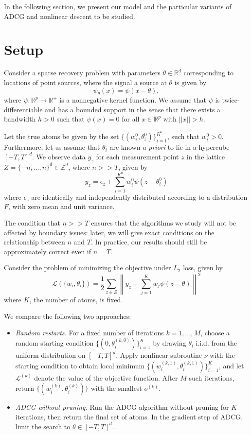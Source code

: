 \documentclass[11pt]{article}
\begin{document}
In the following section, we present our model and the particular
variants of ADCG and nonlinear descent to be studied.

\section{Setup}\label{section:Setup}

Consider a sparse recovery problem with parameters $\theta \in
\mathbb{R}^d$ corresponding to locations of point sources, where the
signal a source at $\theta$ is given by
\[
\psi_\theta(x) = \psi(x - \theta),
\]
where $\psi: \mathbb{R}^p \to \mathbb{R}^+$ is a nonnegative kernel
function.  We assume that $\psi$ is twice-differentiable and has a
bounded support in the sense that there exists a bandwidth $h > 0$
such that $\psi(x) = 0$ for all $x \in \mathbb{R}^p$ with $||x|| > h$.

Let the true atoms be given by the set $\{(w_i^0,
\theta_i^0)\}_{i=1}^{K^0}$, such that $w_i^0 > 0$.  Furthermore, let
us assume that $\theta_i$ are known \emph{a priori} to lie in a
hypercube $[-T, T]^d$.  We observe data $y_z$ for each measurement
point $z$ in the lattice $Z = \{-n,..., n\}^d \in \mathbb{Z}^d$, where $n
>> T$, given by
\[
y_z = \epsilon_z + \sum_{i=1}^{K^0} w_i^0 \psi(z - \theta_i^0)
\]
where $\epsilon_z$ are identically and independently distributed
according to a distribution $F$, with zero mean and unit variance.

The condition that $n >> T$ ensures that the algorithms we study will
not be affected by boundary issues: later, we will give exact
conditions on the relationship between $n$ and $T$.  In practice, our
results should still be approximately correct even if $n = T$.

Consider the problem of minimizing the objective under $L_2$ loss, given by
\[
\mathcal{L}(\{w_i, \theta_i\}) = \frac{1}{2}\sum_{z \in Z} \left\|y_z - \sum_{j=1}^K w_j \psi(z - \theta) \right\|^2
\]
where $K$, the number of atoms, is fixed.

We compare the following two approaches:
\begin{itemize}
\item \emph{Random restarts.} 
For a fixed number of iterations $k = 1,\hdots, M$,
choose a random starting condition $\{(0, \theta_i^{(k, 0)})\}_{i=1}^K$
by drawing $\theta_i$ i.i.d. from the uniform distribution on $[-T,T]^d$.
Apply nonlinear subroutine $\nu$ with the starting condition
to obtain local minimum $\{(w_i^{(k, 1)}, \theta_i^{(k, 1)})\}_{i=1}^K$,
and let $\mathcal{L}^{(k)}$ denote the value of the objective function.
After $M$ such iterations, return $\{(w_i^{(k)}, \theta_i^{(k)})\}$ with the smallest $o^{(k)}$.
\item \emph{ADCG without pruning.}
Run the ADCG algorithm without pruning for $K$ iterations, then return the final set of atoms.
In the gradient step of ADCG, limit the search to $\theta \in [-T, T]^d$.
\end{itemize}
\end{document}
